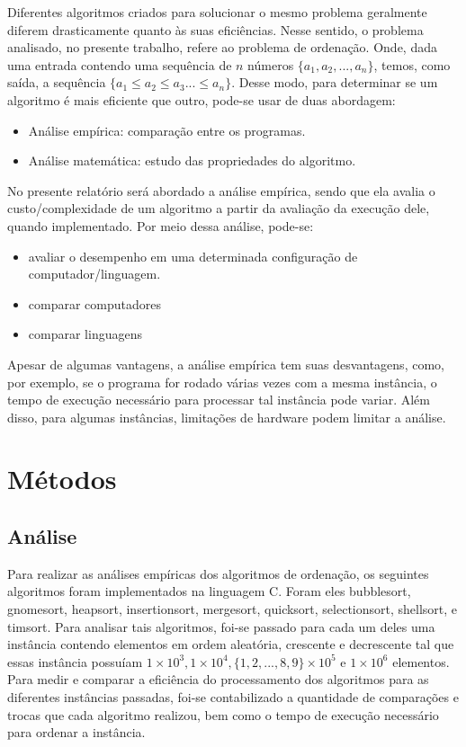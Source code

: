 \documentclass[report]{uftex}
\begin{document}
Diferentes algoritmos criados para solucionar o mesmo problema geralmente diferem drasticamente quanto às suas eficiências. Nesse sentido, o problema analisado, no presente trabalho, refere ao problema de ordenação. Onde, dada uma entrada contendo uma sequência de $n$ números $\{a_1,a_2,...,a_n\}$, temos, como saída, a sequência $\{a_1 \leq a_2 \leq a_3 ... \leq a_n\}$. Desse modo, para determinar se um algoritmo é mais eficiente que outro, pode-se usar de duas abordagem:
\begin{itemize}
    \item Análise empírica: comparação entre os programas.
    \item Análise matemática: estudo das propriedades do algoritmo.
\end{itemize}

No presente relatório será abordado a análise empírica, sendo que ela avalia o custo/complexidade de um algoritmo a partir da avaliação da execução dele, quando implementado. Por meio dessa análise, pode-se:
\begin{itemize}
    \item avaliar o desempenho em uma determinada configuração de computador/linguagem.
    \item comparar computadores
    \item comparar linguagens
\end{itemize}

Apesar de algumas vantagens, a análise empírica tem suas desvantagens, como, por exemplo, se o programa for rodado várias vezes com a mesma instância, o tempo de execução necessário para processar tal instância pode variar. Além disso, para algumas instâncias, limitações de hardware podem limitar a análise.

\chapter{Métodos}


\section{Análise}
Para realizar as análises empíricas dos algoritmos de ordenação, os seguintes algoritmos foram implementados na linguagem C. Foram eles bubblesort, gnomesort, heapsort, insertionsort, mergesort, quicksort, selectionsort, shellsort, e timsort. Para analisar tais algoritmos, foi-se passado para cada um deles uma instância contendo elementos em ordem aleatória, crescente e decrescente tal que essas instância possuíam $1\times10^{3}, 1\times10^{4}, \{1,2,...,8,9\}\times10^{5}$ e $1\times10^{6}$ elementos. Para medir e comparar a eficiência do processamento dos algoritmos para as diferentes instâncias passadas, foi-se contabilizado a quantidade de comparações e trocas que cada algoritmo realizou, bem como o tempo de execução necessário para ordenar a instância.
\end{document}
